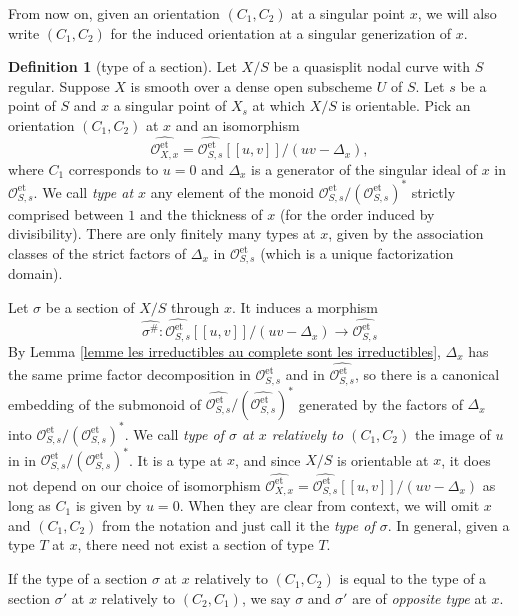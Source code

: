 \documentclass[a4paper,12pt]{amsart} %
\numberwithin{equation}{subsection}
\newcommand{\on}[1]{\operatorname{#1}}
\theoremstyle{definition}
\newtheorem{definition}{Definition}[section]
\theoremstyle{plain}%
\theoremstyle{remark}
\renewcommand{\O}{\mathcal{O}}
\begin{document}
From now on, given an orientation $(C_1,C_2)$ at a singular point $x$, we will also write $(C_1,C_2)$ for the induced orientation at a singular generization of $x$.


\begin{definition}[type of a section]\label{definition:type_of_section}
Let $X/S$ be a quasisplit nodal curve with $S$ regular. Suppose $X$ is smooth over a dense open subscheme $U$ of $S$. Let $s$ be a point of $S$ and $x$ a singular point of $X_s$ at which $X/S$ is orientable. Pick an orientation $(C_1,C_2)$ at $x$ and an isomorphism
\[
\widehat{\O_{X,x}^{\on{et}}}=\widehat{\O_{S,s}^{\on{et}}}[[u,v]]/(uv-\Delta_x),
\]
where $C_1$ corresponds to $u=0$ and $\Delta_x$ is a generator of the singular ideal of $x$ in $\O_{S,s}^{\on{et}}$. We call \emph{type at $x$} any element of the monoid $\O_{S,s}^{\on{et}}/(\O_{S,s}^{\on{et}})^*$ strictly comprised between $1$ and the thickness of $x$ (for the order induced by divisibility). There are only finitely many types at $x$, given by the association classes of the strict factors of $\Delta_x$ in $\O_{S,s}^{\on{et}}$ (which is a unique factorization domain).

Let $\sigma$ be a section of $X/S$ through $x$. It induces a morphism
\[
\widehat{\sigma^\#} \colon \widehat{\O_{S,s}^{\on{et}}}[[u,v]]/(uv-\Delta_x) \to \widehat{\O_{S,s}^{\on{et}}}
\]
By Lemma \ref{lemme les irreductibles au complete sont les irreductibles}, $\Delta_x$ has the same prime factor decomposition in $\O_{S,s}^{\on{et}}$ and in $\widehat{\O_{S,s}^{\on{et}}}$, so there is a canonical embedding of the submonoid of $\widehat{\O_{S,s}^{\on{et}}}/(\widehat{\O_{S,s}^{\on{et}}})^*$ generated by the factors of $\Delta_x$ into $\O_{S,s}^{\on{et}}/(\O_{S,s}^{\on{et}})^*$. We call \emph{type of $\sigma$ at $x$ relatively to $(C_1,C_2)$} the image of $u$ in in $\O_{S,s}^{\on{et}}/(\O_{S,s}^{\on{et}})^*$. It is a type at $x$, and since $X/S$ is orientable at $x$, it does not depend on our choice of isomorphism $\widehat{\O_{X,x}^{\on{et}}}=\widehat{\O_{S,s}^{\on{et}}}[[u,v]]/(uv-\Delta_x)$ as long as $C_1$ is given by $u=0$. When they are clear from context, we will omit $x$ and $(C_1,C_2)$ from the notation and just call it the \emph{type of $\sigma$}. In general, given a type $T$ at $x$, there need not exist a section of type $T$.

If the type of a section $\sigma$ at $x$ relatively to $(C_1,C_2)$ is equal to the type of a section $\sigma'$ at $x$ relatively to $(C_2,C_1)$, we say $\sigma$ and $\sigma'$ are of \emph{opposite type} at $x$.
\end{definition}
\end{document}
